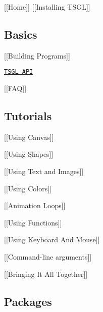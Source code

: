 \mbox{[}\mbox{[}Home\mbox{]}\mbox{]} \mbox{[}\mbox{[}Installing T\-S\-G\-L\mbox{]}\mbox{]}

\subsection*{Basics}


\begin{DoxyItemize}
\item \mbox{[}\mbox{[}Building Programs\mbox{]}\mbox{]}
\item \href{http://calvin-cs.github.io/TSGL/html/annotated.html}{\tt T\-S\-G\-L A\-P\-I}
\item \mbox{[}\mbox{[}F\-A\-Q\mbox{]}\mbox{]}
\end{DoxyItemize}

\subsection*{Tutorials}


\begin{DoxyItemize}
\item \mbox{[}\mbox{[}Using Canvas\mbox{]}\mbox{]}
\item \mbox{[}\mbox{[}Using Shapes\mbox{]}\mbox{]}
\item \mbox{[}\mbox{[}Using Text and Images\mbox{]}\mbox{]}
\item \mbox{[}\mbox{[}Using Colors\mbox{]}\mbox{]}
\item \mbox{[}\mbox{[}Animation Loops\mbox{]}\mbox{]}
\item \mbox{[}\mbox{[}Using Functions\mbox{]}\mbox{]}
\item \mbox{[}\mbox{[}Using Keyboard And Mouse\mbox{]}\mbox{]}
\item \mbox{[}\mbox{[}Command-\/line arguments\mbox{]}\mbox{]}
\item \mbox{[}\mbox{[}Bringing It All Together\mbox{]}\mbox{]}
\end{DoxyItemize}

\subsection*{Packages}


